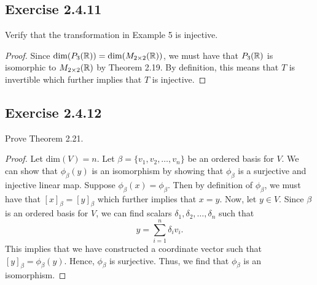 \subsection*{Exercise 2.4.11} Verify that the transformation in Example 5 is injective.
\begin{proof}
Since \( \text{dim}({P}_{3}(\mathbb{R})) = \text{dim}({M}_{2 \times 2}(\mathbb{R})) \), we must have that \( {P}_{3}(\mathbb{R})  \) is isomorphic to \( {M}_{2 \times 2}(\mathbb{R}) \) by Theorem 2.19. By definition, this means that \( T  \) is invertible which further implies that \( T  \) is injective.
\end{proof}

\subsection*{Exercise 2.4.12} Prove Theorem 2.21.
\begin{proof}
    Let \( \text{dim}(V) = n  \). Let \( \beta = \{ {v}_{1}, { v }_{2}, \dots, {v}_{n} \}   \) be an ordered basis for \( V  \). We can show that \( {\phi}_{\beta}(y)  \) is an isomorphism by showing that \( {\phi}_{\beta} \) is a surjective and injective linear map. Suppose \( {\phi}_{\beta}(x) = {\phi}_{\beta} \). Then by definition of \( {\phi}_{\beta} \), we must have that \( [x]_{\beta} = [y]_{\beta} \) which further implies that \( x = y  \). Now, let \( y \in V  \). Since \( \beta \) is an ordered basis for \( V  \), we can find scalars \( {\delta}_{1}, {\delta}_{2}, \dots, {\delta}_{n} \) such that 
    \[  y = \sum_{ i=1  }^{ n } {\delta}_{i} {v}_{i}. \]
    This implies that we have constructed a coordinate vector such that \( [y]_{\beta} = {\phi}_{\beta}(y)\). Hence, \( {\phi}_{\beta} \) is surjective. Thus, we find that \( {\phi}_{\beta} \) is an isomorphism.
\end{proof}

